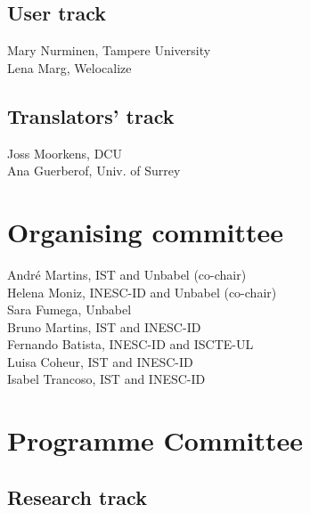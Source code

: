 \documentclass[a4paper,11pt,twoside]{book}
\begin{document}
\subsection*{User track}
\noindent Mary Nurminen, Tampere University\\
\noindent Lena Marg, Welocalize

\subsection*{Translators' track}
\noindent Joss Moorkens, DCU\\
\noindent Ana Guerberof, Univ. of Surrey

\section*{Organising committee}
\noindent André Martins, IST and Unbabel (co-chair)\\
\noindent Helena Moniz, INESC-ID and Unbabel (co-chair)\\
\noindent Sara Fumega, Unbabel\\
\noindent Bruno Martins, IST and INESC-ID\\
\noindent Fernando Batista, INESC-ID and ISCTE-UL\\
\noindent Luisa Coheur, IST and INESC-ID\\
\noindent Isabel Trancoso, IST and INESC-ID

\pagebreak

\section*{Programme Committee}
\subsection*{Research track}
\end{document}
